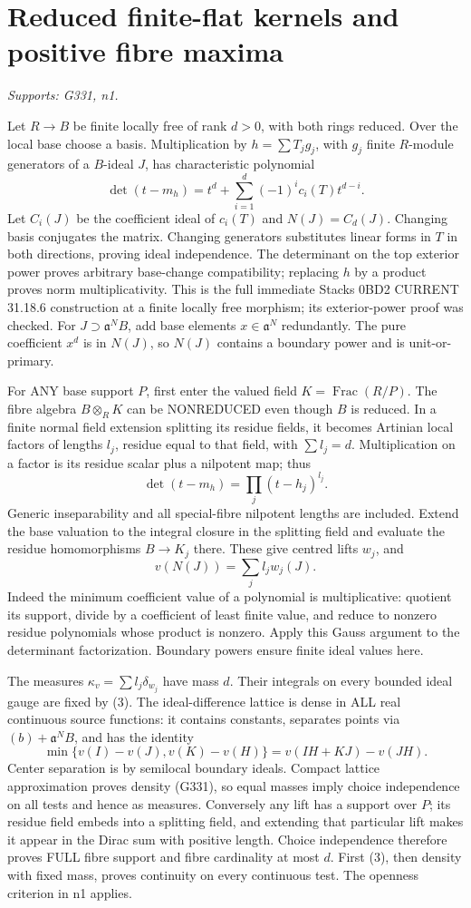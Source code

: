 \section{Reduced finite-flat kernels and positive fibre maxima}
\textit{Supports: G331, n1.}

Let $R\to B$ be finite locally free of rank $d>0$, with both rings reduced. Over the local base choose a basis. Multiplication by $h=\sum T_jg_j$, with $g_j$ finite $R$-module generators of a $B$-ideal $J$, has characteristic polynomial
\[
\det(t-m_h)=t^d+\sum_{i=1}^d(-1)^ic_i(T)t^{d-i}.
\]
Let $C_i(J)$ be the coefficient ideal of $c_i(T)$ and $N(J)=C_d(J)$. Changing basis conjugates the matrix. Changing generators substitutes linear forms in $T$ in both directions, proving ideal independence. The determinant on the top exterior power proves arbitrary base-change compatibility; replacing $h$ by a product proves norm multiplicativity. This is the full immediate Stacks 0BD2 CURRENT 31.18.6 construction at a finite locally free morphism; its exterior-power proof was checked. For $J\supset\mathfrak a^NB$, add base elements $x\in\mathfrak a^N$ redundantly. The pure coefficient $x^d$ is in $N(J)$, so $N(J)$ contains a boundary power and is unit-or-primary.

For ANY base support $P$, first enter the valued field $K=\operatorname{Frac}(R/P)$. The fibre algebra $B\otimes_RK$ can be NONREDUCED even though $B$ is reduced. In a finite normal field extension splitting its residue fields, it becomes Artinian local factors of lengths $l_j$, residue equal to that field, with $\sum l_j=d$. Multiplication on a factor is its residue scalar plus a nilpotent map; thus
\[
\det(t-m_h)=\prod_j(t-h_j)^{l_j}.
\]
Generic inseparability and all special-fibre nilpotent lengths are included. Extend the base valuation to the integral closure in the splitting field and evaluate the residue homomorphisms $B\to K_j$ there. These give centred lifts $w_j$, and
\[
v(N(J))=\sum_j l_jw_j(J).                              \tag{3}
\]
Indeed the minimum coefficient value of a polynomial is multiplicative: quotient its support, divide by a coefficient of least finite value, and reduce to nonzero residue polynomials whose product is nonzero. Apply this Gauss argument to the determinant factorization. Boundary powers ensure finite ideal values here.

The measures $\kappa_v=\sum l_j\delta_{w_j}$ have mass $d$. Their integrals on every bounded ideal gauge are fixed by (3). The ideal-difference lattice is dense in ALL real continuous source functions: it contains constants, separates points via $(b)+\mathfrak a^N B$, and has the identity
\[
\min\{v(I)-v(J),v(K)-v(H)\}=v(IH+KJ)-v(JH).
\]
Center separation is by semilocal boundary ideals. Compact lattice approximation proves density (G331), so equal masses imply choice independence on all tests and hence as measures. Conversely any lift has a support over $P$; its residue field embeds into a splitting field, and extending that particular lift makes it appear in the Dirac sum with positive length. Choice independence therefore proves FULL fibre support and fibre cardinality at most $d$. First (3), then density with fixed mass, proves continuity on every continuous test. The openness criterion in n1 applies.

